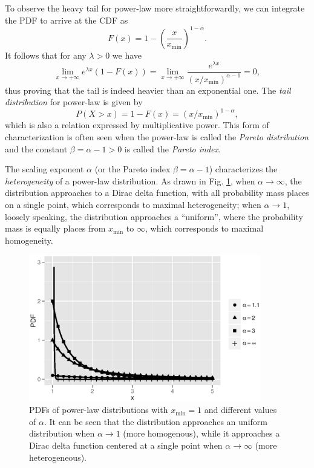 To observe the heavy tail for power-law more straightforwardly, we can integrate the PDF to arrive at the CDF as 
\begin{equation}
F(x) = 1 - (\frac{x}{x_{\min}})^{1-\alpha}.
\end{equation}
It follows that for any $ \lambda>0 $ we have 
\[ \lim_{x \rightarrow +\infty} e^{\lambda x} (1-F(x)) = \lim_{x \rightarrow +\infty} \frac{e^{\lambda x}}{(x/x_{\min})^{\alpha-1}} =0,\]
thus proving that the tail is indeed heavier than an exponential one. 
The \textit{tail distribution} for power-law is given by
\begin{equation}
P(X>x) = 1-F(x) = (x/x_{\min})^{1-\alpha}, 
\end{equation}
which is also a relation expressed by multiplicative power. This form of characterization is often seen when the power-law is called the \textit{Pareto distribution} and the constant $ \beta=\alpha-1 > 0 $ is called the \textit{Pareto index}.

The scaling exponent $ \alpha $ (or the Pareto index $ \beta=\alpha-1 $) characterizes the \textit{heterogeneity} of a power-law distribution. As drawn in Fig. \ref{fig:ch2_alpha}, when $ \alpha \rightarrow \infty $, the distribution approaches to a Dirac delta function, with all probability mass places on a single point, which corresponds to maximal heterogeneity; when $ \alpha \rightarrow 1 $, loosely speaking, the distribution approaches a ``uniform'', where the probability mass is equally places from $ x_{\min} $ to $ \infty $, which corresponds to maximal homogeneity. 

\begin{figure}[!h]
\begin{center}
\includegraphics[width=0.9\textwidth]{figures/ch2_alpha.eps}
\caption{PDFs of power-law distributions with $ x_{\min}=1 $ and different values of $ \alpha $. It can be seen that the distribution approaches an uniform distribution when $ \alpha \rightarrow 1 $ (more homogenous), while it approaches a Dirac delta function centered at a single point when $ \alpha \rightarrow \infty $ (more heterogeneous).   }
\label{fig:ch2_alpha}
\end{center}
\end{figure}

